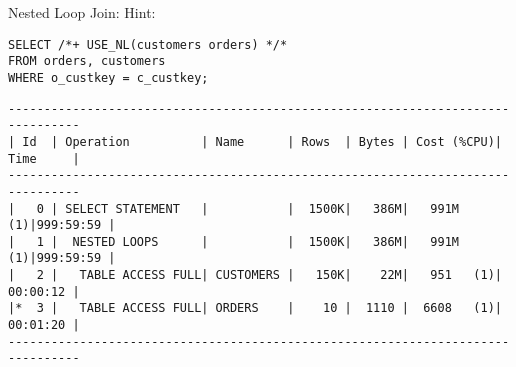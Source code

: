 \documentclass[11pt,a4paper,parskip=half]{scrartcl}
\begin{document}
Nested Loop Join:
Hint:
\begin{lstlisting}
SELECT /*+ USE_NL(customers orders) */* 
FROM orders, customers
WHERE o_custkey = c_custkey;
\end{lstlisting}
\begin{lstlisting}
--------------------------------------------------------------------------------                                                                                                                                                                                                                             
| Id  | Operation          | Name      | Rows  | Bytes | Cost (%CPU)| Time     |                                                                                                                                                                                                                             
--------------------------------------------------------------------------------                                                                                                                                                                                                                             
|   0 | SELECT STATEMENT   |           |  1500K|   386M|   991M  (1)|999:59:59 |                                                                                                                                                                                                                             
|   1 |  NESTED LOOPS      |           |  1500K|   386M|   991M  (1)|999:59:59 |                                                                                                                                                                                                                             
|   2 |   TABLE ACCESS FULL| CUSTOMERS |   150K|    22M|   951   (1)| 00:00:12 |                                                                                                                                                                                                                             
|*  3 |   TABLE ACCESS FULL| ORDERS    |    10 |  1110 |  6608   (1)| 00:01:20 |                                                                                                                                                                                                                             
--------------------------------------------------------------------------------                                                                                                                                                                                                                             
                                                                                                                                                                                                                                                                                                             

\end{lstlisting}
\end{document}
